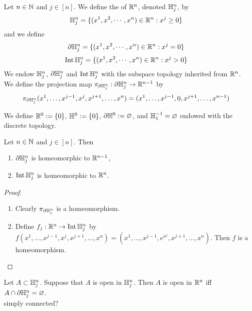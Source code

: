 \documentclass{book}
\begin{document}
	\begin{defn} 
		Let $n \in \mathbb{N}$ and $j \in [n]$. We define the  of $\mathbb{R}^n$, denoted $\mathbb{H}_j^n$, by $$\mathbb{H}_j^n = \{(x^1, x^2, \cdots, x^n) \in \mathbb{R}^n: x^j \geq 0\}$$ and we define $$\partial\mathbb{H}_j^n = \{(x^1, x^2, \cdots, x^n) \in \mathbb{R}^n: x^j = 0\}$$ 
		$$\operatorname{Int} \mathbb{H}_j^n = \{(x^1, x^2, \cdots, x^n) \in \mathbb{R}^n: x^j > 0\}$$
		We endow $\mathbb{H}_j^n$, $\partial \mathbb{H}_j^n$ and $\operatorname{Int} \mathbb{H}_j^n $ with the subspace topology inherited from $\mathbb{R}^n$.\\
		We define the projection map $\pi_{\partial \mathbb{H}^n_j}: \partial \mathbb{H}_j^n \rightarrow \mathbb{R}^{n-1}$ by 
		$$\pi_{\partial \mathbb{H}^n_j}(x^1, \ldots, x^{j-1}, x^j, x^{j+1}, \ldots, x^n) = (x^1, \ldots, x^{j-1}, 0, x^{j+1}, \ldots,  x^{n-1})$$
	\end{defn}

	\begin{defn} 
		We define $\mathbb{R}^0 \vcentcolon= \{0\}$, $\mathbb{H}^0 \vcentcolon= \{0\}$, $\partial \mathbb{H}^0 \vcentcolon= \varnothing$, and $\mathbb{H}^{-1}_1 = \varnothing$ endowed with the discrete topology.
	\end{defn}

	
	\begin{note}
	\end{note}
	
	\begin{ex} 
		Let $n \in \mathbb{N}$ and $j \in [n]$. Then 
	\begin{enumerate}
		\item $\partial \mathbb{H}^n_j$ is homeomorphic to $\mathbb{R}^{n-1}$,
		\item $\operatorname{Int} \mathbb{H}^n_j$ is homeomorphic to $\mathbb{R}^n$.
	\end{enumerate}  
	\end{ex}
	
	\begin{proof}\
	\begin{enumerate}
		\item Clearly $\pi_{\partial \mathbb{H}^n_j}$ is a homeomorphism.
		\item Define $f_j: \mathbb{R}^n \rightarrow \operatorname{Int} \mathbb{H}^n_j$ by $f(x^1, \ldots, x^{j-1}, x^j, x^{j+1}, \ldots, x^n) = (x^1, \ldots, x^{j-1}, e^{x^j}, x^{j+1}, \ldots, x^n)$. Then $f$ is a homeomorphism.
	\end{enumerate}
	\end{proof}	

	\begin{ex} 
		Let $A \subset \mathbb{H}^n_j$. Suppose that $A$ is open in $\mathbb{H}^n_j$. Then $A$ is open in $\mathbb{R}^n$ iff $A \cap \partial \mathbb{H}^n_j = \varnothing$. \\
		\tbf{Hint:} simply connected?
	\end{ex}	
\end{document}
